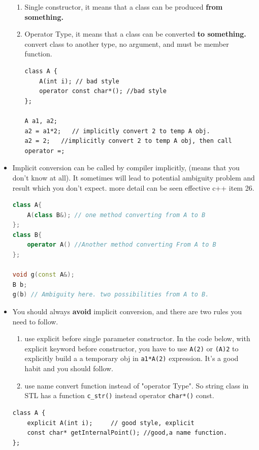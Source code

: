 \documentclass[a4paper,11pt,twoside]{book}
\begin{document}
\begin{itemize}
\begin{enumerate}
	\item Single constructor, it means that a class can be produced \textbf{from something.}
	
	\item Operator Type, it means that a class can be converted \textbf{to something.} convert class to another type, no argument, and must be member function.

\begin{lstlisting}
class A {
	A(int i); // bad style
	operator const char*(); //bad style
};

A a1, a2;
a2 = a1*2;   // implicitly convert 2 to temp A obj.
a2 = 2;   //implicitly convert 2 to temp A obj, then call operator =;	
\end{lstlisting}	
	
\end{enumerate}


	\item Implicit conversion can be called by compiler implicitly, (means that you don't know at all). It sometimes will lead to potential ambiguity problem and result which you don't expect. more detail can be seen effective c++ item 26.
\begin{lstlisting}[frame=single, language=c++]
class A{
	A(class B&); // one method converting from A to B
};
class B{
	operator A() //Another method converting From A to B
};

void g(const A&);
B b;
g(b) // Ambiguity here. two possibilities from A to B. 	
\end{lstlisting}

\item You should always \textbf{avoid} implicit conversion, and there are two rules you need to follow.
\begin{enumerate}
	\item use explicit before single parameter constructor. In the code below, with explicit keyword before constructor,  you have to use \texttt{A(2)} or \texttt{(A)2} to explicitly build a a temporary obj in \texttt{a1*A(2)} expression. It's a good habit and you should follow. 
	
	\item use name convert function instead of  "operator Type". So string class in STL has a function \texttt{c\_str()} instead operator \texttt{char*()} const. 
\end{enumerate}
\begin{lstlisting}[numbers=none]
class A {
	explicit A(int i);     // good style, explicit
	const char* getInternalPoint(); //good,a name function.
};	


\end{lstlisting}
\end{itemize}
\end{document}
